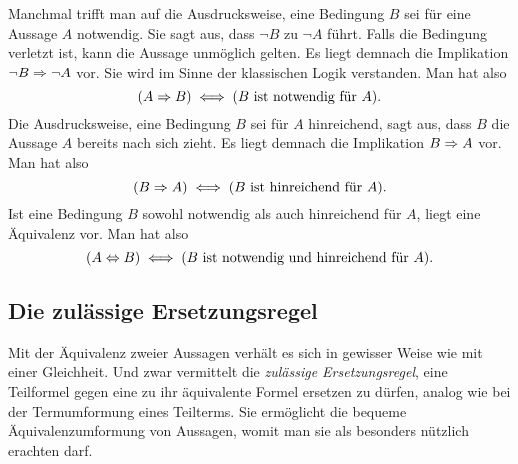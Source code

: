 Manchmal trifft man auf die Ausdrucksweise, eine Bedingung $B$ sei für
eine Aussage $A$ notwendig. Sie sagt aus, dass $\lnot B$ zu $\lnot A$
führt. Falls die Bedingung verletzt ist, kann die Aussage unmöglich
gelten. Es liegt demnach die Implikation $\lnot B\Rightarrow\lnot A$ vor.
Sie wird im Sinne der klassischen Logik verstanden. Man hat also
\[(A\Rightarrow B) \iff (\text{$B$ ist notwendig für $A$}).\]
Die Ausdrucksweise, eine Bedingung $B$ sei für $A$ hinreichend,
sagt aus, dass $B$ die Aussage $A$ bereits nach sich zieht. Es liegt
demnach die Implikation $B\Rightarrow A$ vor. Man hat also
\[(B\Rightarrow A) \iff (\text{$B$ ist hinreichend für $A$}).\]
Ist eine Bedingung $B$ sowohl notwendig als auch hinreichend für $A$,
liegt eine Äquivalenz vor. Man hat also
\[(A\Leftrightarrow B) \iff (\text{$B$ ist notwendig und hinreichend für $A$}).\]

\newpage
\subsection{Die zulässige Ersetzungsregel}

Mit der Äquivalenz zweier Aussagen verhält es sich in gewisser Weise
wie mit einer Gleichheit. Und zwar vermittelt die \emph{zulässige
Ersetzungsregel}, eine Teilformel gegen eine zu ihr äquivalente
Formel ersetzen zu dürfen, analog wie bei der Termumformung eines
Teilterms. Sie ermöglicht die bequeme Äquivalenzumformung von
Aussagen, womit man sie als besonders nützlich erachten darf.

